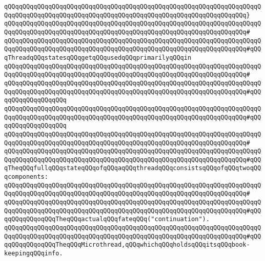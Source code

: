 \verb|qQQqqQQqqQQqqQQqqQQqqQQqqQQqqQQqqQQqqQQqqQQqqQQqqQQqqQQqqQQqqQQqqQQqqQQqqQQqqQQqqQQqqQQqqQQqqQQqqQQqqQQqqQQqqQQqqQQqqQQqqQQqqQQqqQQqqQQq}|\newline
\verb|qQQqqQQqqQQqqQQqqQQqqQQqqQQqqQQqqQQqqQQqqQQqqQQqqQQqqQQqqQQqqQQqqQQqqQQqqQQqqQQqqQQqqQQqqQQqqQQqqQQqqQQqqQQqqQQqqQQqqQQqqQQqqQQqqQQqqQQq#|\newline
\verb|qQQqqQQqqQQqqQQqqQQqqQQqqQQqqQQqqQQqqQQqqQQqqQQqqQQqqQQqqQQqqQQqqQQqqQQqqQQqqQQqqQQqqQQqqQQqqQQqqQQqqQQqqQQqqQQqqQQqqQQqqQQqqQQqqQQqqQQq#qQQqThreadqQQqstatesqQQqgetqQQqusedqQQqprimarilyqQQqin|\newline
\verb|qQQqqQQqqQQqqQQqqQQqqQQqqQQqqQQqqQQqqQQqqQQqqQQqqQQqqQQqqQQqqQQqqQQqqQQqqQQqqQQqqQQqqQQqqQQqqQQqqQQqqQQqqQQqqQQqqQQqqQQqqQQqqQQqqQQqqQQq#|\newline
\verb|qQQqqQQqqQQqqQQqqQQqqQQqqQQqqQQqqQQqqQQqqQQqqQQqqQQqqQQqqQQqqQQqqQQqqQQqqQQqqQQqqQQqqQQqqQQqqQQqqQQqqQQqqQQqqQQqqQQqqQQqqQQqqQQqqQQqqQQq#qQQqqQQqqQQqqQQqqQQq|\newline
\verb|qQQqqQQqqQQqqQQqqQQqqQQqqQQqqQQqqQQqqQQqqQQqqQQqqQQqqQQqqQQqqQQqqQQqqQQqqQQqqQQqqQQqqQQqqQQqqQQqqQQqqQQqqQQqqQQqqQQqqQQqqQQqqQQqqQQqqQQq#qQQqqQQqqQQqqQQqqQQq|\newline
\verb|qQQqqQQqqQQqqQQqqQQqqQQqqQQqqQQqqQQqqQQqqQQqqQQqqQQqqQQqqQQqqQQqqQQqqQQqqQQqqQQqqQQqqQQqqQQqqQQqqQQqqQQqqQQqqQQqqQQqqQQqqQQqqQQqqQQqqQQq#|\newline
\verb|qQQqqQQqqQQqqQQqqQQqqQQqqQQqqQQqqQQqqQQqqQQqqQQqqQQqqQQqqQQqqQQqqQQqqQQqqQQqqQQqqQQqqQQqqQQqqQQqqQQqqQQqqQQqqQQqqQQqqQQqqQQqqQQqqQQqqQQq#qQQqTheqQQqfullqQQqstateqQQqofqQQqaqQQqthreadqQQqconsistsqQQqofqQQqtwoqQQqcomponents:|\newline
\verb|qQQqqQQqqQQqqQQqqQQqqQQqqQQqqQQqqQQqqQQqqQQqqQQqqQQqqQQqqQQqqQQqqQQqqQQqqQQqqQQqqQQqqQQqqQQqqQQqqQQqqQQqqQQqqQQqqQQqqQQqqQQqqQQqqQQqqQQq#|\newline
\verb|qQQqqQQqqQQqqQQqqQQqqQQqqQQqqQQqqQQqqQQqqQQqqQQqqQQqqQQqqQQqqQQqqQQqqQQqqQQqqQQqqQQqqQQqqQQqqQQqqQQqqQQqqQQqqQQqqQQqqQQqqQQqqQQqqQQqqQQq#qQQqqQQqqQQqoqQQqTheqQQqactualqQQqfateqQQq("continuation").|\newline
\verb|qQQqqQQqqQQqqQQqqQQqqQQqqQQqqQQqqQQqqQQqqQQqqQQqqQQqqQQqqQQqqQQqqQQqqQQqqQQqqQQqqQQqqQQqqQQqqQQqqQQqqQQqqQQqqQQqqQQqqQQqqQQqqQQqqQQqqQQq#qQQqqQQqqQQqoqQQqTheqQQqMicrothread,qQQqwhichqQQqholdsqQQqitsqQQqbook-keepingqQQqinfo.|\newline
